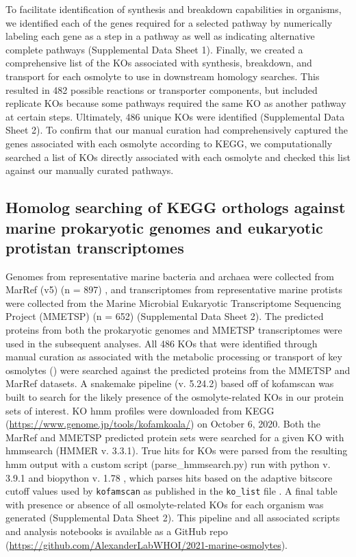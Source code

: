 \documentclass[utf8]{frontiersSCNS} %
\begin{document}
To facilitate identification of synthesis and breakdown capabilities in organisms, we identified each of the genes required for a selected pathway by numerically labeling each gene as a step in a pathway as well as indicating alternative complete pathways (Supplemental Data Sheet 1). Finally, we created a comprehensive list of the KOs associated with synthesis, breakdown, and transport for each osmolyte to use in downstream homology searches. This resulted in 482 possible reactions or transporter components, but included replicate KOs because some pathways required the same KO as another pathway at certain steps. Ultimately, 486 unique KOs were identified (Supplemental Data Sheet 2). To confirm that our manual curation had comprehensively captured the genes associated with each osmolyte according to KEGG, we computationally searched a list of KOs directly associated with each osmolyte and checked this list against our manually curated pathways.

\subsection{Homolog searching of KEGG orthologs against marine prokaryotic genomes and eukaryotic protistan transcriptomes}

Genomes from representative marine bacteria and archaea were collected from MarRef (v5) (n = 897) \citep{ten_Hoopen_2017,Klemetsen_2017}, and transcriptomes from representative marine protists were collected from the Marine Microbial Eukaryotic Transcriptome Sequencing Project (MMETSP) (n = 652) \citep{Johnson_2018, Keeling_2014} (Supplemental Data Sheet 2). The predicted proteins from both the prokaryotic genomes and MMETSP transcriptomes were used in the subsequent analyses. All 486 KOs that were identified through manual curation as associated with the metabolic processing or transport of key osmolytes () were searched against the predicted proteins from the MMETSP and MarRef datasets. A snakemake pipeline (v. 5.24.2) \citep{M_lder_2021} based off of kofamscan \citep{Aramaki_2019, Mistry_2013} was built to search for the likely presence of the osmolyte-related KOs in our protein sets of interest. KO hmm profiles were downloaded from KEGG (\url{https://www.genome.jp/tools/kofamkoala/}) on October 6, 2020. Both the MarRef and MMETSP predicted protein sets were searched for a given KO with hmmsearch (HMMER v. 3.3.1). True hits for KOs were parsed from the resulting hmm output with a custom script (parse\_hmmsearch.py) run with python v. 3.9.1 and biopython v. 1.78 \citep{Cock_2009}, which parses hits based on the adaptive bitscore cutoff values used by \texttt{kofamscan} as published in the \texttt{ko\_list} file \citep{Aramaki_2019}. A final table with presence or absence of all osmolyte-related KOs for each organism was generated (Supplemental Data Sheet 2). This pipeline and all associated scripts and analysis notebooks is available as a GitHub repo (\url{https://github.com/AlexanderLabWHOI/2021-marine-osmolytes}). 
\end{document}
